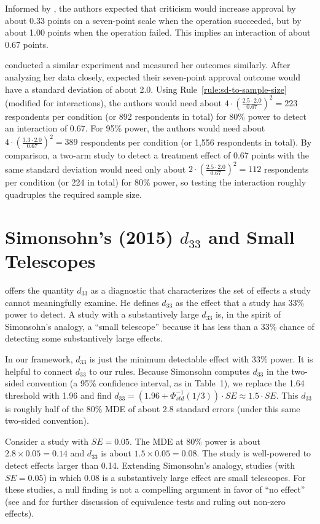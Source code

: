 \documentclass[12pt]{article}
\begin{document}
Informed by \citet{Myrick2020}, the authors expected that criticism would increase approval by about 0.33 points on a seven-point scale when the operation succeeded, but by about 1.00 points when the operation failed.
This implies an interaction of about 0.67 points.

\citet{Myrick2020} conducted a similar experiment and measured her outcomes similarly.
After analyzing her data closely, \citet{Robbins2024} expected their seven-point approval outcome would have a standard deviation of about 2.0.
Using Rule~\ref{rule:sd-to-sample-size} (modified for interactions), the authors would need about $4 \cdot \left( \frac{2.5 \cdot 2.0}{0.67} \right)^{2} = 223$ respondents per condition (or 892 respondents in total) for 80\% power to detect an interaction of 0.67.
For 95\% power, the authors would need about $4 \cdot \left( \frac{3.3 \cdot 2.0}{0.67} \right)^{2} = 389$ respondents per condition (or 1,556 respondents in total).
By comparison, a two-arm study to detect a treatment effect of 0.67 points with the same standard deviation would need only about $2 \cdot \left( \frac{2.5 \cdot 2.0}{0.67} \right)^{2} = 112$ respondents per condition (or 224 in total) for 80\% power, so testing the interaction roughly quadruples the required sample size.

\section{Simonsohn's (2015) $d_{33}$ and Small Telescopes}\label{app:telescopes}

\citet{Simonsohn2015} offers the quantity $d_{33}$ as a diagnostic that characterizes the set of effects a study cannot meaningfully examine.
He defines $d_{33}$ as the effect that a study has 33\% power to detect.
A study with a substantively large $d_{33}$ is, in the spirit of Simonsohn's analogy, a ``small telescope'' because it has less than a 33\% chance of detecting some substantively large effects.

In our framework, $d_{33}$ is just the minimum detectable effect with 33\% power.
It is helpful to connect $d_{33}$ to our rules.
Because Simonsohn computes $d_{33}$ in the two-sided convention (a 95\% confidence interval, as in Table~1), we replace the 1.64 threshold with 1.96 and find $d_{33} = (1.96 + \Phi_{std}^{-1}(1/3)) \cdot SE \approx 1.5 \cdot SE$.
This $d_{33}$ is roughly half of the 80\% MDE of about 2.8 standard errors (under this same two-sided convention).

Consider a study with $SE = 0.05$.
The MDE at 80\% power is about $2.8 \times 0.05 = 0.14$ and $d_{33}$ is about $1.5 \times 0.05 = 0.08$.
The study is well-powered to detect effects larger than 0.14.
Extending Simonsohn's analogy, studies (with $SE = 0.05$) in which 0.08 is a substantively large effect are small telescopes.
For these studies, a null finding is not a compelling argument in favor of ``no effect'' (see \citealt{Rainey2014} and \citealt{Lakens2018} for further discussion of equivalence tests and ruling out non-zero effects).
\end{document}
